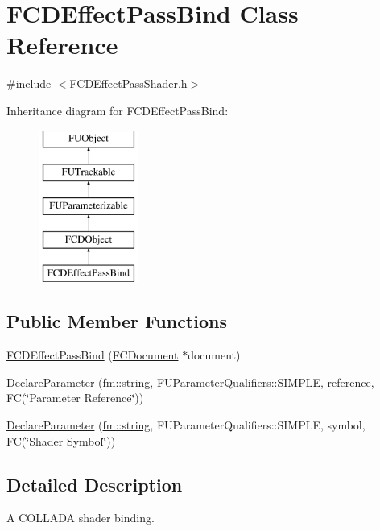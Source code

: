 \hypertarget{classFCDEffectPassBind}{
\section{FCDEffectPassBind Class Reference}
\label{classFCDEffectPassBind}
}


{\ttfamily \#include $<$FCDEffectPassShader.h$>$}

Inheritance diagram for FCDEffectPassBind:\begin{figure}[H]
\begin{center}
\leavevmode
\includegraphics[height=5.000000cm]{classFCDEffectPassBind}
\end{center}
\end{figure}
\subsection*{Public Member Functions}
\begin{DoxyCompactItemize}
\item 
\hyperlink{classFCDEffectPassBind_a3e81f0a6b03a384c17068f07374d2297}{FCDEffectPassBind} (\hyperlink{classFCDocument}{FCDocument} $\ast$document)
\item 
\hyperlink{classFCDEffectPassBind_a848da92f37f19d2e8cd02ffffedf636f}{DeclareParameter} (\hyperlink{classfm_1_1stringT}{fm::string}, FUParameterQualifiers::SIMPLE, reference, FC(\char`\"{}Parameter Reference\char`\"{}))
\item 
\hyperlink{classFCDEffectPassBind_ad3ccd5fc342438687c3592d4eaecf317}{DeclareParameter} (\hyperlink{classfm_1_1stringT}{fm::string}, FUParameterQualifiers::SIMPLE, symbol, FC(\char`\"{}Shader Symbol\char`\"{}))
\end{DoxyCompactItemize}


\subsection{Detailed Description}
A COLLADA shader binding.

